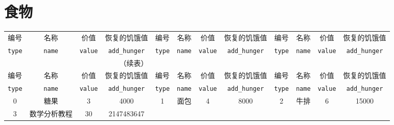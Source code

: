 \documentclass[UTF8,fontset=none,linespread=1.2]{ctexart}
\begin{document}
\section{食物}
\begin{center}
\begin{longtable}{|c|c|c|c||c|c|c|c||c|c|c|c|}
\hline
编号&名称&价值&恢复的饥饿值&编号&名称&价值&恢复的饥饿值&编号&名称&价值&恢复的饥饿值\\
\lstinline|type|&\lstinline|name|&\lstinline|value|&\lstinline|add_hunger|&\lstinline|type|&\lstinline|name|&\lstinline|value|&\lstinline|add_hunger|&\lstinline|type|&\lstinline|name|&\lstinline|value|&\lstinline|add_hunger|\\\hline
\endfirsthead
\multicolumn{4}{r}{（续表）}\\
\hline
编号&名称&价值&恢复的饥饿值&编号&名称&价值&恢复的饥饿值&编号&名称&价值&恢复的饥饿值\\
\lstinline|type|&\lstinline|name|&\lstinline|value|&\lstinline|add_hunger|&\lstinline|type|&\lstinline|name|&\lstinline|value|&\lstinline|add_hunger|&\lstinline|type|&\lstinline|name|&\lstinline|value|&\lstinline|add_hunger|\\\hline
\endhead
0&糖果&3&4000&1&面包&4&8000&2&牛排&6&15000\\\hline
3&数学分析教程&30&2147483647&\multicolumn{8}{c}{}\\\cline{1-4}
\end{longtable}
\end{center}
\end{document}
